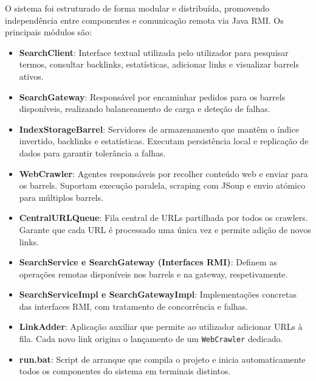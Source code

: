 \documentclass{article}
\begin{document}
O sistema foi estruturado de forma modular e distribuída, promovendo independência entre componentes e comunicação remota via Java RMI. Os principais módulos são:

\begin{itemize} \item \textbf{SearchClient}: Interface textual utilizada pelo utilizador para pesquisar termos, consultar backlinks, estatísticas, adicionar links e visualizar barrels ativos.

\item \textbf{SearchGateway}: Responsável por encaminhar pedidos para os barrels disponíveis, realizando balanceamento de carga e deteção de falhas.

\item \textbf{IndexStorageBarrel}: Servidores de armazenamento que mantêm o índice invertido, backlinks e estatísticas. Executam persistência local e replicação de dados para garantir tolerância a falhas.

\item \textbf{WebCrawler}: Agentes responsáveis por recolher conteúdo web e enviar para os barrels. Suportam execução paralela, scraping com JSoup e envio atómico para múltiplos barrels.

\item \textbf{CentralURLQueue}: Fila central de URLs partilhada por todos os crawlers. Garante que cada URL é processado uma única vez e permite adição de novos links.

\item \textbf{SearchService e SearchGateway (Interfaces RMI)}: Definem as operações remotas disponíveis nos barrels e na gateway, respetivamente.

\item \textbf{SearchServiceImpl e SearchGatewayImpl}: Implementações concretas das interfaces RMI, com tratamento de concorrência e falhas.

\item \textbf{LinkAdder}: Aplicação auxiliar que permite ao utilizador adicionar URLs à fila. Cada novo link origina o lançamento de um \texttt{WebCrawler} dedicado.

\item \textbf{run.bat}: Script de arranque que compila o projeto e inicia automaticamente todos os componentes do sistema em terminais distintos.
\end{itemize}
\end{document}
